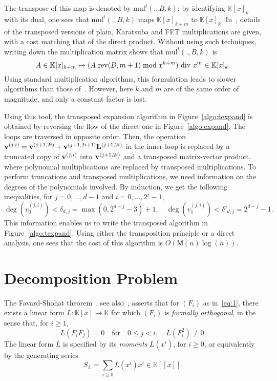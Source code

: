 \documentclass{elsart}
\def\K {\ensuremath{\mathbb{K}}}
\def\M {\ensuremath{\mathsf{M}}}
\def\mul{\mathrm{mul}}
\def\rev{\mathrm{rev}}
\begin{document}
The transpose of this map is denoted by $\mul^t(.,B,k)$; by
identifying $\K[x]_k$ with its dual, one sees that $\mul^t(.,B,k)$
maps $\K[x]_{k+m}$ to $\K[x]_{k}$. In~\cite{BoLeSc03,HaQuZi04},
details of the transposed versions of plain, Karatsuba and FFT
multiplications are given, with a cost matching that of the direct
product. Without using such techniques, writing down the
multiplication matrix shows that $\mul^t(.,B,k)$ is $$A \in
\K[x]_{k+m} \mapsto (A\ \rev(B,m+1) \bmod x^{k+m}){\rm~div~}x^{m} \in
\K[x]_k.$$ Using standard multiplication algorithms, this formulation
leads to slower algorithms than those
of~\cite{BoLeSc03,HaQuZi04}. However, here $k$ and $m$ are of the same
order of magnitude, and only a constant factor is lost.

Using this tool, the transposed expansion algorithm in
Figure~\ref{algo:texpand} is obtained by reversing the flow of the
direct one in Figure~\ref{algo:expand}. The loops are traversed in
opposite order. Then, the operation ${\bf v}^{(j,i)} = {\bf
v}^{(j+1,2i)} + {\bf v}^{(j+1,2i+1)} {\bf L}^{(j+1,2i)}$ in the inner
loop is replaced by a truncated copy of ${\bf v}^{(j,i)}$ into ${\bf
v}^{(j+1,2i)}$ and a transposed matrix-vector product, where
polynomial multiplications are replaced by transposed
multiplications. To perform truncations and transposed
multiplications, we need information on the degrees of the polynomials
involved. By induction, we get the following inequalities, for $j=0,\dots,d-1$
and $i=0,\dots,2^j-1$, $$\deg(v^{(j,i)}_0) <
\delta_{d,j}=\max(0,2^{d-j}-3)+1, \quad \deg(v^{(j,i)}_1) <
\delta'_{d,j}=2^{d-j}-1.$$ This information enables us to write the
transposed algorithm in Figure~\ref{algo:texpand}. Using either the
transposition principle or a direct analysis, one sees that the cost
of this algorithm is $O(\M(n)\log(n))$.






\section{Decomposition Problem}\label{sec:decomp}

The Favard-Shohat theorem~\cite{Favard35,Shohat36}, see
also~\cite[Theorem 4.4]{Chihara78}, asserts that for $(F_i)$ as
in~\eqref{eq:1}, there exists a linear form $L: \K[x] \to\K$ for which
$(F_i)$ is {\it formally orthogonal}, in the sense that, for $i \ge
1$,
\begin{equation*}
L(F_i F_j) =0 \quad\text{for}\quad 0 \le j < i, \quad L(F_i^2)\ne 0.
\end{equation*} 
The linear form $L$ is specified by its {\it moments} $L(x^i)$, for $i
\ge 0$, or equivalently by the generating series $$S_L = \sum_{i \ge
0} L(x^i) x^i \in \K[[x]].$$
\end{document}
